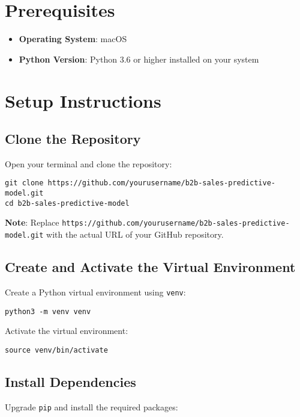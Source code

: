 \documentclass{article}
\begin{document}
\section{Prerequisites}

\begin{itemize}
    \item \textbf{Operating System}: macOS
    \item \textbf{Python Version}: Python 3.6 or higher installed on your system
\end{itemize}

\section{Setup Instructions}

\subsection{Clone the Repository}

Open your terminal and clone the repository:

\begin{verbatim}
git clone https://github.com/yourusername/b2b-sales-predictive-model.git
cd b2b-sales-predictive-model
\end{verbatim}

\textbf{Note}: Replace \verb|https://github.com/yourusername/b2b-sales-predictive-model.git| with the actual URL of your GitHub repository.

\subsection{Create and Activate the Virtual Environment}

Create a Python virtual environment using \verb|venv|:

\begin{verbatim}
python3 -m venv venv
\end{verbatim}

Activate the virtual environment:

\begin{verbatim}
source venv/bin/activate
\end{verbatim}

\subsection{Install Dependencies}

Upgrade \verb|pip| and install the required packages:
\end{document}
